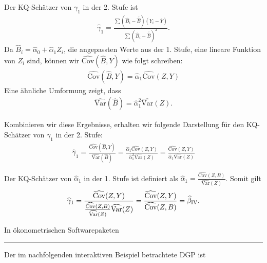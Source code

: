 \documentclass[
  a4paper,
  DIV=11,
  oneside]{scrreprt}
\begin{document}
Der KQ-Schätzer von \(\gamma_1\) in der 2. Stufe ist \begin{align}
  \widehat{\gamma}_1 = \frac{\sum (\widehat{B}_i - \overline{\widehat{B}})(Y_i - \bar{Y})}{\sum (\widehat{B}_i - \bar{\widehat{B}})^2}.
\end{align} Da
\(\widehat{B}_i = \widehat{\alpha}_0 + \widehat{\alpha}_1 Z_i\), die
angepassten Werte aus der 1. Stufe, eine lineare Funktion von \(Z_i\)
sind, können wir \(\widehat{\text{Cov}}(\widehat{B}, Y)\) wie folgt
schreiben: \begin{align}
  \widehat{\text{Cov}}(\widehat{B}, Y) = \widehat{\alpha}_1 \widehat{\text{Cov}}(Z, Y)
\end{align} Eine ähnliche Umformung zeigt, dass \begin{align}
  \widehat{\text{Var}}(\widehat{B}) = \widehat{\alpha}_1^2 \widehat{\text{Var}}(Z).
\end{align}

Kombinieren wir diese Ergebnisse, erhalten wir folgende Darstellung für
den KQ-Schätzer von \(\gamma_1\) in der 2. Stufe: \begin{align}
  \widehat{\gamma}_1 = \frac{\widehat{\text{Cov}}(\widehat{B}, Y)}{\widehat{\text{Var}}(\widehat{B})} = \frac{\widehat{\alpha}_1 \widehat{\text{Cov}}(Z, Y)}{\widehat{\alpha}_1^2 \widehat{\text{Var}}(Z)} = \frac{\widehat{\text{Cov}}(Z, Y)}{\widehat{\alpha}_1 \widehat{\text{Var}}(Z)}
\end{align}

Der KQ-Schätzer von \(\widehat{\alpha}_1\) in der 1. Stufe ist definiert
als
\(\widehat{\alpha}_1 = \frac{\widehat{\text{Cov}}(Z, B)}{\widehat{\text{Var}}(Z)}\).
Somit gilt \begin{align}
  \widehat{\gamma}_1 = \frac{\widehat{\text{Cov}}(Z, Y)}{\frac{\widehat{\text{Cov}}(Z, B)}{\widehat{\text{Var}}(Z)} \widehat{\text{Var}}(Z)} = \frac{\widehat{\text{Cov}}(Z, Y)}{\widehat{\text{Cov}}(Z, B)} = \widehat{\beta}_{\textup{IV}}.
\end{align}

In ökonometrischen Softwarepaketen

\begin{center}\rule{0.5\linewidth}{0.5pt}\end{center}

Der im nachfolgenden interaktiven Beispiel betrachtete DGP ist
\end{document}
